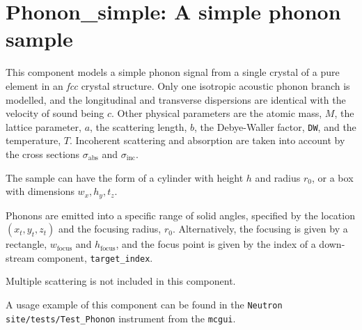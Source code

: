 \section{Phonon\_simple: A simple phonon sample}
\label{s:phonon_simple}


This component models a simple phonon signal from a single crystal of
a pure element in an {\em fcc} crystal structure.
Only one isotropic acoustic phonon branch is modelled, and the longitudinal
and transverse dispersions are identical with the velocity of sound being $c$.
Other physical parameters are the atomic mass, $M$, the lattice parameter, $a$,
the scattering length, $b$,
the Debye-Waller factor, \verb+DW+, and the temperature, $T$.
Incoherent scattering and absorption are taken into account by the cross
sections $\sigma_\textrm{abs}$ and $\sigma_\textrm{inc}$.

The sample can have the form of a cylinder with height $h$ and radius
$r_0$, or a box with dimensions $w_x, h_y, t_z$.

Phonons are emitted into a specific range of solid angles, specified
by the location $(x_t, y_t, z_t)$ and the focusing radius, $r_0$.
Alternatively, the focusing is given by a rectangle,
$w_\textrm{focus}$ and $h_\textrm{focus}$, and the focus point is given by the
index of a down-stream component, \verb+target_index+.

Multiple scattering is not included in this component.

A usage example of this component can be found in the \verb+Neutron site/tests/Test_Phonon+ instrument from the \verb+mcgui+.


